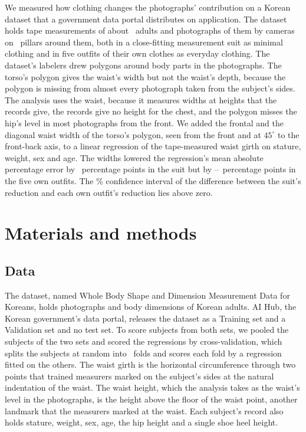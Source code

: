 \documentclass[12pt]{article}
\begin{document}
We measured how clothing changes the photographs' contribution on a Korean dataset that a government data portal
distributes on application.\cite{aihub560} The dataset holds tape measurements of about \subjectsPlanned\ adults and
photographs of them by cameras on \pillarsTotal\ pillars around them, both in a close-fitting measurement suit as
minimal clothing and in five outfits of their own clothes as everyday clothing. The dataset's labelers drew polygons around body parts in the photographs. The torso's polygon gives the waist's width but not the waist's depth, because the polygon is
missing from almost every photograph taken from the subject's sides. The analysis uses the waist, because it measures widths at heights that the records give, the records give no
height for the chest, and the polygon misses the hip's
level in most photographs from the front.
We added the frontal and the
diagonal waist width of the torso's polygon, seen from the front and at $45^\circ$ to the front-back axis, to a linear regression of the tape-measured waist girth on stature, weight, sex and age. The widths lowered the regression's mean absolute percentage error by \redSuit\ percentage
points in the suit but by \redOwnMin--\redOwnMax\ percentage points in the five own outfits. The \ciLevel\% confidence
interval of the difference between the suit's reduction and each own outfit's reduction lies above zero.

\section{Materials and methods}\label{sec:methods}

\subsection{Data}\label{sec:data}

The dataset, named Whole Body Shape and Dimension Measurement Data for Koreans, holds photographs and body dimensions
of Korean adults.\cite{aihub560} AI Hub, the Korean government's data portal, releases the dataset as a
Training set and a Validation set and no test set. To score subjects from both sets, we pooled the subjects of the two sets and
scored the regressions by cross-validation, which splits the subjects at random into \nFolds\ folds and
scores each fold by a regression fitted on the others. The waist girth is the horizontal
circumference through two points that trained measurers marked on the subject's sides at the natural indentation of the
waist. The waist height, which the analysis takes as the waist's level in the photographs, is the height above the floor of the waist
point, another landmark that the measurers marked at the waist. Each subject's record also holds stature,
weight, sex, age, the hip height and a single shoe heel height.
\end{document}

